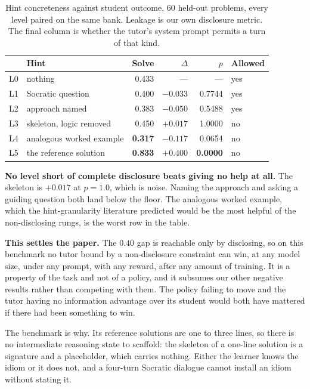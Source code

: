 \begin{table}[t]
\caption{Hint concreteness against student outcome, 60 held-out problems, every
level paired on the same bank. Leakage is our own disclosure metric. The final
column is whether the tutor's system prompt permits a turn of that kind.}
\label{tab:ladder}
\centering
\small
\begin{tabular}{llrrrl}
\toprule
 & \textbf{Hint} & \textbf{Solve} & \textbf{$\Delta$} & \textbf{$p$} & \textbf{Allowed} \\
\midrule
L0 & nothing                   & 0.433 & ---      & ---    & yes \\
L1 & Socratic question         & 0.400 & $-0.033$ & 0.7744 & yes \\
L2 & approach named            & 0.383 & $-0.050$ & 0.5488 & yes \\
L3 & skeleton, logic removed   & 0.450 & $+0.017$ & 1.0000 & no \\
L4 & analogous worked example  & \textbf{0.317} & $-0.117$ & 0.0654 & no \\
L5 & the reference solution     & \textbf{0.833} & $+0.400$ & \textbf{0.0000} & no \\
\bottomrule
\end{tabular}
\end{table}

\textbf{No level short of complete disclosure beats giving no help at all.} The
skeleton is $+0.017$ at $p{=}1.0$, which is noise. Naming the approach and
asking a guiding question both land below the floor. The analogous worked
example, which the hint-granularity literature predicted would be the most
helpful of the non-disclosing rungs, is the worst row in the table.

\textbf{This settles the paper.} The $0.40$ gap is reachable only by
disclosing, so on this benchmark no tutor bound by a non-disclosure constraint
can win, at any model size, under any prompt, with any reward, after any amount
of training. It is a property of the task and not of a policy, and it subsumes
our other negative results rather than competing with them. The policy failing
to move and the tutor having no information advantage over its student would
both have mattered if there had been something to win.

The benchmark is why. Its reference solutions are one to three lines, so there
is no intermediate reasoning state to scaffold: the skeleton of a one-line
solution is a signature and a placeholder, which carries nothing. Either the
learner knows the idiom or it does not, and a four-turn Socratic dialogue
cannot install an idiom without stating it.

